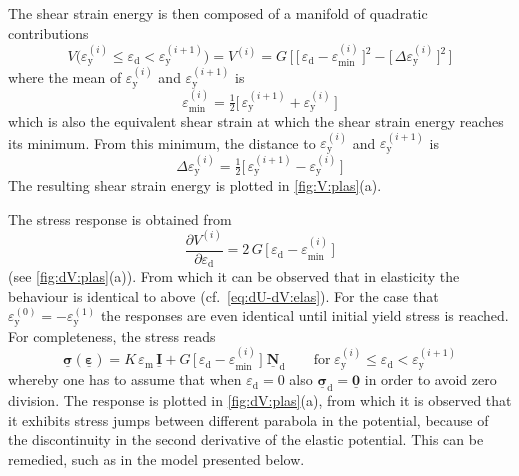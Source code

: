 \documentclass[fleqn]{goose-article}
\newcommand\T[1]{\underline{\bm{{#1}}}}
\begin{document}
The shear strain energy is then composed of a manifold of quadratic contributions
\begin{equation}
    \label{eq:V-plas}
    V \big(
        \varepsilon_\mathrm{y}^{(i)} \leq \varepsilon_\mathrm{d} < \varepsilon_\mathrm{y}^{(i+1)}
    \big)
    =
    V^{(i)}
    =
    G \, \bigg[\,
        \Big[\, \varepsilon_\mathrm{d} - \varepsilon_\mathrm{min}^{(i)} \,\Big]^2
        -
        \Big[\, \Delta \varepsilon_\mathrm{y}^{(i)} \,\Big]^2
    \,\bigg]
\end{equation}
where the mean of $\varepsilon_\mathrm{y}^{(i)}$ and $\varepsilon_\mathrm{y}^{(i+1)}$ is
\begin{equation}
    \varepsilon_\mathrm{min}^{(i)}
    =
    \tfrac{1}{2} \Big[\, \varepsilon_\mathrm{y}^{(i+1)} + \varepsilon_\mathrm{y}^{(i)} \,\Big]
\end{equation}
which is also the equivalent shear strain at which the shear strain energy reaches its minimum.
From this minimum, the distance to $\varepsilon_\mathrm{y}^{(i)}$ and
$\varepsilon_\mathrm{y}^{(i+1)}$ is
\begin{equation}
    \Delta \varepsilon_\mathrm{y}^{(i)}
    =
    \tfrac{1}{2} \Big[\, \varepsilon_\mathrm{y}^{(i+1)} - \varepsilon_\mathrm{y}^{(i)} \,\Big]
\end{equation}
The resulting shear strain energy is plotted in \cref{fig:V:plas}(a).

The stress response is obtained from
\begin{equation}
    \label{eq:dV-plas}
    \frac{\partial V^{(i)}}{\partial \varepsilon_\mathrm{d}}
    =
    2 \, G \, \Big[\, \varepsilon_\mathrm{d} - \varepsilon_\mathrm{min}^{(i)} \,\Big]
\end{equation}
(see \cref{fig:dV:plas}(a)).
From which it can be observed that in elasticity the behaviour is identical to above
(cf.~\cref{eq:dU-dV:elas}).
For the case that $\varepsilon_\mathrm{y}^{(0)} = - \varepsilon_\mathrm{y}^{(1)}$ the
responses are even identical until initial yield stress is reached.
For completeness, the stress reads
\begin{equation}
    \T{\sigma} ( \T{\varepsilon} )
    =
    K \, \varepsilon_\mathrm{m} \, \T{I}
    +
    G \, \Big[\, \varepsilon_\mathrm{d} - \varepsilon_\mathrm{min}^{(i)} \,\Big] \;
    \T{N}_\mathrm{d}
    \qquad
    \mathrm{for}
    \;
    \varepsilon_\mathrm{y}^{(i)} \leq \varepsilon_\mathrm{d} < \varepsilon_\mathrm{y}^{(i+1)}
\end{equation}
whereby one has to assume that when $\varepsilon_\mathrm{d} = 0$ also
$\T{\sigma}_\mathrm{d} = \T{0}$ in order to avoid zero division.
The response is plotted in \cref{fig:dV:plas}(a),
from which it is observed that it exhibits stress jumps between different parabola in the potential,
because of the discontinuity in the second derivative of the elastic potential.
This can be remedied, such as in the model presented below.
\end{document}
